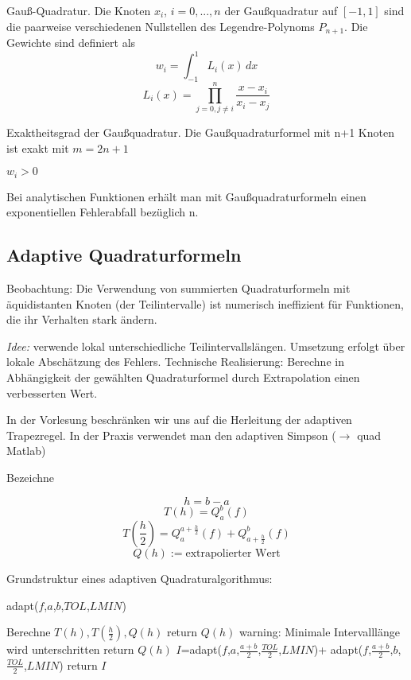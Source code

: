 \begin{definition}[Definition I.7] Gauß-Quadratur. Die Knoten $x_i$, $i=0,...,n$ der Gaußquadratur auf $[-1, 1]$ sind die paarweise verschiedenen Nullstellen des Legendre-Polynoms $P_{n+1}$. Die Gewichte sind definiert als 
	$$w_i = \int^1_{-1}\!L_i(x) \,dx$$	
	$$L_i(x) = \prod_{j=0, j \ne i}^n \frac{x-x_i}{x_i-x_j}$$
\end{definition}


\begin{theorem}[Satz I.7] Exaktheitsgrad der Gaußquadratur. Die Gaußquadraturformel mit n+1 Knoten ist exakt mit $m = 2n+1$
\end{theorem}

\begin{remark}$w_i > 0$\end{remark}
\begin{remark}Bei analytischen Funktionen erhält man mit Gaußquadraturformeln einen exponentiellen Fehlerabfall bezüglich n.\end{remark}

\subsection{Adaptive Quadraturformeln}

Beobachtung: Die Verwendung von summierten Quadraturformeln mit äquidistanten Knoten (der Teilintervalle) ist numerisch ineffizient für Funktionen, die ihr Verhalten stark ändern.

\emph{Idee:} verwende lokal unterschiedliche Teilintervallslängen. Umsetzung erfolgt über lokale Abschätzung des Fehlers. Technische Realisierung: Berechne in Abhängigkeit der gewählten Quadraturformel durch Extrapolation einen verbesserten Wert.

\begin{remark}
	In der Vorlesung beschränken wir uns auf die Herleitung der adaptiven Trapezregel. In der Praxis verwendet man den adaptiven Simpson ($\rightarrow$ quad Matlab)
\end{remark}

Bezeichne 

$$h = b - a$$
$$T(h) = Q_a^b(f)$$
$$T(\frac{h}{2}) = Q_a^{a+\frac{h}{2}}(f) + Q_{a+\frac{h}{2}}^b(f)$$
$$Q(h):= \text{extrapolierter Wert}$$

Grundstruktur eines adaptiven Quadraturalgorithmus:

\begin{algorithm}
	\caption{adapt($f$,$a$,$b$,$TOL$,$LMIN$)}
	\begin{algorithmic}
		\STATE Berechne $T(h),T(\frac{h}{2}),Q(h)$
			\STATE return $Q(h)$
			\STATE warning: Minimale Intervalllänge wird unterschritten
			\STATE return $Q(h)$
		\ELSE
			\STATE $I$=adapt($f$,$a$,$\frac{a+b}{2}$,$\frac{TOL}{2}$,$LMIN$)+ adapt($f$,$\frac{a+b}{2}$,$b$,$\frac{TOL}{2}$,$LMIN$)
			\STATE return $I$
		\ENDIF
	\end{algorithmic}
\end{algorithm}

